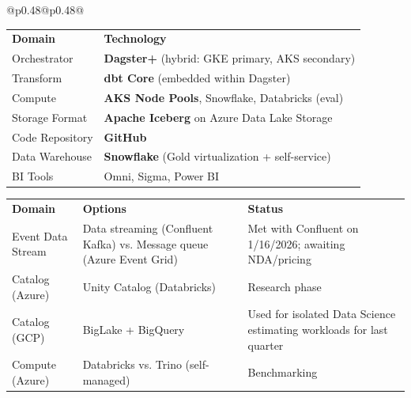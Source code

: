 \documentclass[10pt, a4paper]{article}
\begin{document}
{\begin{tabular}[t]{@{}p{}@{\hspace{0.02\textwidth}}p{}@{}}
\vspace{0.3em}

\begin{tikzpicture}
    \node[fill=kipgreen!20, rounded corners=3pt, inner sep=3pt, text width=\linewidth-6pt, align=left] {\textbf{ARB Agreed Upon}};
\end{tikzpicture}

\vspace{0.1em}

{\footnotesize
\renewcommand{\arraystretch}{1.2}
\begin{tabularx}{\linewidth}{@{}lX@{}}
\rowcolor{black!10}
\textbf{Domain} & \textbf{Technology} \\
\rowcolor{white}
Orchestrator & \textbf{Dagster+} (hybrid: GKE primary, AKS secondary) \\
\rowcolor{black!5}
Transform & \textbf{dbt Core} (embedded within Dagster) \\
\rowcolor{white}
Compute & \textbf{AKS Node Pools}, Snowflake, Databricks (eval) \\
\rowcolor{black!5}
Storage Format & \textbf{Apache Iceberg} on Azure Data Lake Storage \\
\rowcolor{white}
Code Repository & \textbf{GitHub} \\
\rowcolor{black!5}
Data Warehouse & \textbf{Snowflake} (Gold virtualization + self-service) \\
\rowcolor{white}
BI Tools & Omni, Sigma, Power BI \\
\end{tabularx}
\renewcommand{\arraystretch}{1.0}
}

\vspace{0.3em}


\vspace{0.1em}

{\footnotesize
\renewcommand{\arraystretch}{1.4}
\begin{tabularx}{\linewidth}{@{}p{2.3cm}>{\raggedright\arraybackslash}X>{\raggedright\arraybackslash}p{3.5cm}@{}}
\rowcolor{black!10}
\textbf{Domain} & \textbf{Options} & \textbf{Status} \\
\rowcolor{white}
Event Data Stream & Data streaming (Confluent Kafka) vs. Message queue (Azure Event Grid) & Met with Confluent on 1/16/2026; awaiting NDA/pricing \\
\rowcolor{black!5}
Catalog (Azure) & Unity Catalog (Databricks) & Research phase \\
\rowcolor{white}
Catalog (GCP) & BigLake + BigQuery & Used for isolated Data Science estimating workloads for last quarter \\
\rowcolor{black!5}
Compute (Azure) & Databricks vs. Trino (self-managed) & Benchmarking \\
\end{tabularx}
\renewcommand{\arraystretch}{1.0}
}


\end{tabular}}
\end{document}
